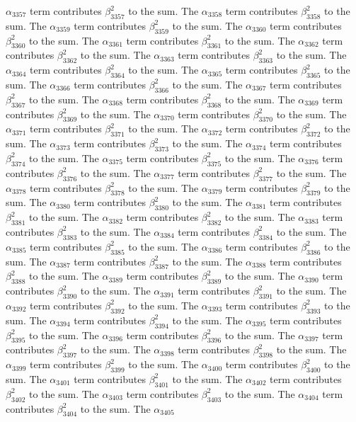 \begin{lemma}
$\alpha_{3357}$ term contributes $\beta_{3357}^{2}$ to the sum. The $\alpha_{3358}$ term contributes $\beta_{3358}^{2}$ to the sum. The $\alpha_{3359}$ term contributes $\beta_{3359}^{2}$ to the sum. The $\alpha_{3360}$ term contributes $\beta_{3360}^{2}$ to the sum. The $\alpha_{3361}$ term contributes $\beta_{3361}^{2}$ to the sum. The $\alpha_{3362}$ term contributes $\beta_{3362}^{2}$ to the sum. The $\alpha_{3363}$ term contributes $\beta_{3363}^{2}$ to the sum. The $\alpha_{3364}$ term contributes $\beta_{3364}^{2}$ to the sum. The $\alpha_{3365}$ term contributes $\beta_{3365}^{2}$ to the sum. The $\alpha_{3366}$ term contributes $\beta_{3366}^{2}$ to the sum. The $\alpha_{3367}$ term contributes $\beta_{3367}^{2}$ to the sum. The $\alpha_{3368}$ term contributes $\beta_{3368}^{2}$ to the sum. The $\alpha_{3369}$ term contributes $\beta_{3369}^{2}$ to the sum. The $\alpha_{3370}$ term contributes $\beta_{3370}^{2}$ to the sum. The $\alpha_{3371}$ term contributes $\beta_{3371}^{2}$ to the sum. The $\alpha_{3372}$ term contributes $\beta_{3372}^{2}$ to the sum. The $\alpha_{3373}$ term contributes $\beta_{3373}^{2}$ to the sum. The $\alpha_{3374}$ term contributes $\beta_{3374}^{2}$ to the sum. The $\alpha_{3375}$ term contributes $\beta_{3375}^{2}$ to the sum. The $\alpha_{3376}$ term contributes $\beta_{3376}^{2}$ to the sum. The $\alpha_{3377}$ term contributes $\beta_{3377}^{2}$ to the sum. The $\alpha_{3378}$ term contributes $\beta_{3378}^{2}$ to the sum. The $\alpha_{3379}$ term contributes $\beta_{3379}^{2}$ to the sum. The $\alpha_{3380}$ term contributes $\beta_{3380}^{2}$ to the sum. The $\alpha_{3381}$ term contributes $\beta_{3381}^{2}$ to the sum. The $\alpha_{3382}$ term contributes $\beta_{3382}^{2}$ to the sum. The $\alpha_{3383}$ term contributes $\beta_{3383}^{2}$ to the sum. The $\alpha_{3384}$ term contributes $\beta_{3384}^{2}$ to the sum. The $\alpha_{3385}$ term contributes $\beta_{3385}^{2}$ to the sum. The $\alpha_{3386}$ term contributes $\beta_{3386}^{2}$ to the sum. The $\alpha_{3387}$ term contributes $\beta_{3387}^{2}$ to the sum. The $\alpha_{3388}$ term contributes $\beta_{3388}^{2}$ to the sum. The $\alpha_{3389}$ term contributes $\beta_{3389}^{2}$ to the sum. The $\alpha_{3390}$ term contributes $\beta_{3390}^{2}$ to the sum. The $\alpha_{3391}$ term contributes $\beta_{3391}^{2}$ to the sum. The $\alpha_{3392}$ term contributes $\beta_{3392}^{2}$ to the sum. The $\alpha_{3393}$ term contributes $\beta_{3393}^{2}$ to the sum. The $\alpha_{3394}$ term contributes $\beta_{3394}^{2}$ to the sum. The $\alpha_{3395}$ term contributes $\beta_{3395}^{2}$ to the sum. The $\alpha_{3396}$ term contributes $\beta_{3396}^{2}$ to the sum. The $\alpha_{3397}$ term contributes $\beta_{3397}^{2}$ to the sum. The $\alpha_{3398}$ term contributes $\beta_{3398}^{2}$ to the sum. The $\alpha_{3399}$ term contributes $\beta_{3399}^{2}$ to the sum. The $\alpha_{3400}$ term contributes $\beta_{3400}^{2}$ to the sum. The $\alpha_{3401}$ term contributes $\beta_{3401}^{2}$ to the sum. The $\alpha_{3402}$ term contributes $\beta_{3402}^{2}$ to the sum. The $\alpha_{3403}$ term contributes $\beta_{3403}^{2}$ to the sum. The $\alpha_{3404}$ term contributes $\beta_{3404}^{2}$ to the sum. The $\alpha_{3405}$ 
\end{lemma}
